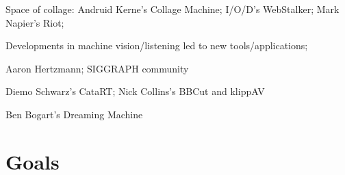 Space of collage: Andruid Kerne's Collage Machine; I/O/D's WebStalker; Mark Napier's Riot; 

Developments in machine vision/listening led to new tools/applications;

Aaron Hertzmann; SIGGRAPH community

Diemo Schwarz's CataRT; Nick Collins's BBCut and klippAV

Ben Bogart's Dreaming Machine


\section{Goals}

